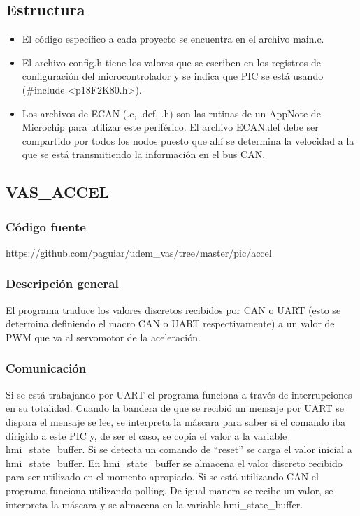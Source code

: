  \subsection{Estructura}
\begin{itemize}
 \item El código específico a cada proyecto se encuentra en el archivo main.c. 
 \item El archivo config.h tiene los valores que se escriben en los registros de configuración del microcontrolador y se indica que PIC se está usando (\#include <p18F2K80.h>).
 \item Los archivos de ECAN (.c, .def, .h) son las rutinas de un AppNote de Microchip para utilizar este periférico. El archivo ECAN.def debe ser compartido por todos los nodos puesto que ahí se determina la velocidad a la que se está transmitiendo la información en el bus CAN.
\end{itemize}

 \subsection{VAS\_ACCEL}
  \subsubsection{Código fuente}
https://github.com/paguiar/udem\_vas/tree/master/pic/accel 

  \subsubsection{Descripción general}
El programa traduce los valores discretos recibidos por CAN o UART (esto se determina definiendo el macro CAN o UART respectivamente) a un valor de PWM que va al servomotor de la aceleración.

  \subsubsection{Comunicación}
Si se está trabajando por UART el programa funciona a través de interrupciones en su totalidad. Cuando la bandera de que se recibió un mensaje por UART se dispara el mensaje se lee, se interpreta la máscara para saber si el comando iba dirigido a este PIC y, de ser el caso, se copia el valor a la variable hmi\_state\_buffer. Si se detecta un comando de “reset” se carga el valor inicial a hmi\_state\_buffer. En hmi\_state\_buffer se almacena el valor discreto recibido para ser utilizado en el momento apropiado. Si se está utilizando CAN el programa funciona utilizando polling. De igual manera se recibe un valor, se interpreta la máscara y se almacena en la variable hmi\_state\_buffer.

